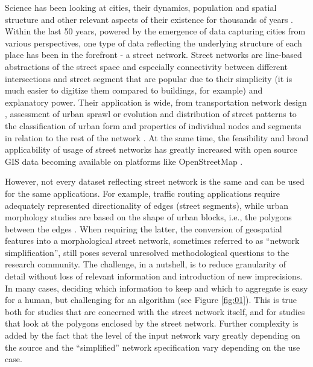 Science has been looking at cities, their dynamics, population and spatial structure and
other relevant aspects of their existence for thousands of years
\cite{rowland2001vitruvius}. Within the last 50 years, powered by the emergence of data
capturing cities from various perspectives, one type of data reflecting the underlying
structure of each place has been in the forefront - a street network. Street networks
are line-based abstractions of the street space and especially connectivity between
different intersections and street segment that are popular due to their simplicity (it
is much easier to digitize them compared to buildings, for example) and explanatory
power. Their application is wide, from transportation network design
\cite{farahani_review_2013}, assessment of urban sprawl \cite{barrington2020global} or
evolution and distribution of street patterns \cite{boeing2018Multiscale; boeing2020off}
to the classification of urban form \cite{araldi2019Street;
fleischmann_methodological_2021} and properties of individual nodes and segments in
relation to the rest of the network \cite{portaNetworkAnalysisUrban2006}. At the same
time, the feasibility and broad applicability of usage of street networks has greatly
increased with open source GIS data becoming available on platforms like OpenStreetMap
\cite{arcaute_recent_2021}.

However, not every dataset reflecting street network is the same and can be used for the
same applications. For example, traffic routing applications require adequately
represented directionality of edges (street segments), while urban morphology studies
are based on the shape of urban blocks, i.e., the polygons between the edges
\cite{dibble_origin_2019}. When requiring the latter, the conversion of geospatial
features into a morphological street network, sometimes referred to as ``network
simplification'', still poses several unresolved methodological questions to the
research community. The challenge, in a nutshell, is to reduce granularity of detail
without loss of relevant information and introduction of new imprecisions. In many
cases, deciding which information to keep and which to aggregate is easy for a human,
but challenging for an algorithm (see Figure \ref{fig:01}). This is true both for
studies that are concerned with the street network itself, and for studies that look at
the polygons enclosed by the street network. Further complexity is added by the fact
that the level of the input network vary greatly depending on the source and the
``simplified'' network specification vary depending on the use case.

